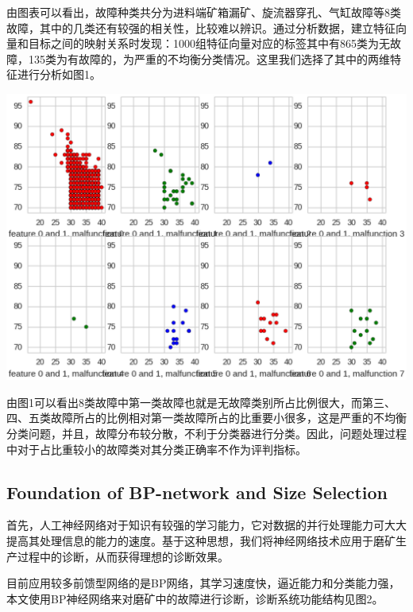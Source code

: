 \documentclass{ctacn}%
\begin{document}
\begin{multicols}{2}

由图表可以看出，故障种类共分为进料端矿箱漏矿、旋流器穿孔、气缸故障等8类故障，其中的几类还有较强的相关性，比较难以辨识。通过分析数据，建立特征向量和目标之间的映射关系时发现：1000组特征向量对应的标签其中有865类为无故障，135类为有故障的，为严重的不均衡分类情况。这里我们选择了其中的两维特征进行分析如图1。
\begin{center}
	\includegraphics[scale=0.4, trim=0 0 0 0]{figs/data_features}\\
	\label{fig1}
\end{center}

由图1可以看出8类故障中第一类故障也就是无故障类别所占比例很大，而第三、四、五类故障所占的比例相对第一类故障所占的比重要小很多，这是严重的不均衡分类问题，并且，故障分布较分散，不利于分类器进行分类。因此，问题处理过程中对于占比重较小的故障类对其分类正确率不作为评判指标。

\subsection{Foundation of BP-network and Size Selection}

首先，人工神经网络对于知识有较强的学习能力，它对数据的并行处理能力可大大提高其处理信息的能力的速度。基于这种思想，我们将神经网络技术应用于磨矿生产过程中的诊断，从而获得理想的诊断效果。

目前应用较多前馈型网络的是BP网络，其学习速度快，逼近能力和分类能力强，本文使用BP神经网络来对磨矿中的故障进行诊断，诊断系统功能结构见图2。


\end{multicols}
\end{document}

